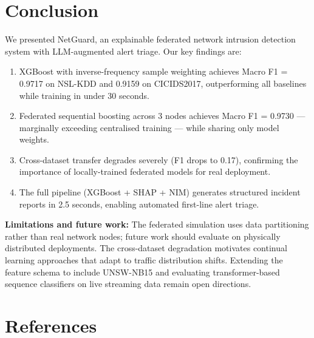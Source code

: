 \documentclass[review]{elsarticle}  %
\begin{document}
\section{Conclusion}
\label{sec:conclusion}

We presented NetGuard, an explainable federated network
intrusion detection system with LLM-augmented alert triage.
Our key findings are:

\begin{enumerate}
    \item XGBoost with inverse-frequency sample weighting achieves
          Macro F1 = 0.9717 on NSL-KDD and 0.9159 on CICIDS2017,
          outperforming all baselines while training in under 30 seconds.

    \item Federated sequential boosting across 3 nodes achieves
          Macro F1 = 0.9730 — marginally exceeding centralised
          training — while sharing only model weights.

    \item Cross-dataset transfer degrades severely (F1 drops to
          0.17), confirming the importance of locally-trained
          federated models for real deployment.

    \item The full pipeline (XGBoost + SHAP + NIM) generates
          structured incident reports in 2.5 seconds, enabling
          automated first-line alert triage.
\end{enumerate}

\textbf{Limitations and future work:} The federated simulation
uses data partitioning rather than real network nodes; future
work should evaluate on physically distributed deployments.
The cross-dataset degradation motivates continual learning
approaches that adapt to traffic distribution shifts.
Extending the feature schema to include UNSW-NB15 \cite{ref23}
and evaluating transformer-based sequence classifiers
\cite{ref8} on live streaming data remain open directions.

\section*{References}

\end{document}
